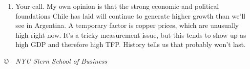 \documentclass[letterpaper,12pt]{article}
\begin{document}
\begin{enumerate}
\begin{enumerate}
\item Your call.  My own opinion is that the strong economic and political 
foundations Chile has laid will continue to generate higher growth 
than we'll see in Argentina. 
A temporary factor is copper prices, which are unusually high right now. 
It's a tricky measurement issue, but this tends to show up as high GDP 
and therefore high TFP.  
History tells us that probably won't last.

\end{enumerate}

\end{enumerate} 

\vfill \centerline{\it \copyright \ \number\year \  
NYU Stern School of Business}
\end{document}
